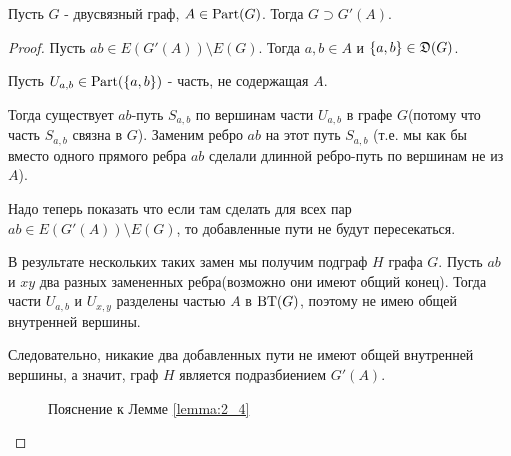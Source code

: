 \begin{lm}[Лемма 2.4] \label{lemma:2_4}
	Пусть $G$ - двусвязный граф,  $A \in \operatorname{Part}(G)$.
	Тогда  $G \supset G'(A)$.
\end{lm}
\begin{proof}
	Пусть $ab \in E(G'(A)) \setminus E(G)$.
	Тогда  $a, b \in A$ и  $\{a, b\} \in \mathfrak{D}(G)$. 

	Пусть $U_{a, b} \in \operatorname{Part}(\{a, b\})$ - часть, не содержащая $A$.

	Тогда существует  $ab$-путь $S_{a, b}$ по вершинам части  $U_{a, b}$ в графе $G$(потому что часть $S_{a, b}$ связна в $G$).
	Заменим ребро  $ab$ на этот путь  $S_{a, b}$ (т.е. мы как бы вместо одного прямого ребра $ab$ сделали длинной ребро-путь по вершинам не из $A$).

	Надо теперь показать что если там сделать для всех пар $ab \in E(G'(A)) \setminus E(G)$, то добавленные пути не будут пересекаться.

	В результате нескольких таких замен мы получим подграф $H$ графа  $G$.
	Пусть $ab$ и  $xy$ два разных замененных ребра(возможно они имеют общий конец).
	Тогда части  $U_{a, b}$ и  $U_{x, y}$ разделены частью  $A$ в  $\operatorname{BT}(G)$, поэтому не имею общей внутренней вершины.

	Следовательно, никакие два добавленных пути не имеют общей внутренней вершины, а значит, граф $H$ является подразбиением  $G'(A)$.
	
\begin{figure}[ht]
    \centering
	\caption{Пояснение к Лемме \ref{lemma:2_4}}
    \label{fig:lemma_2_4}
\end{figure}

\end{proof}


